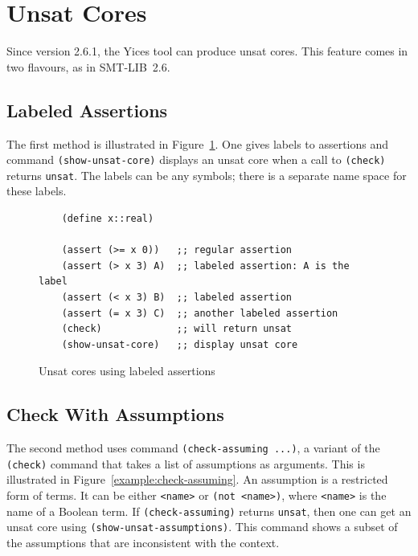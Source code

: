 \documentclass[11pt,twoside,fleqn,openright,titlepage]{cslreport}
\begin{document}
\section{Unsat Cores}

Since version 2.6.1, the Yices tool can produce unsat cores. This
feature comes in two flavours, as in SMT-LIB~2.6.

\subsection{Labeled Assertions}

The first method is illustrated in
Figure~\ref{example:labeled-assertions}. One gives labels to assertions and
command \texttt{(show-unsat-core)} displays an unsat core when a call
to \texttt{(check)} returns \texttt{unsat}.  The labels can be any
symbols; there is a separate name space for these labels.

\begin{figure}[h]
\begin{footnotesize}
\begin{verbatim}
    (define x::real)

    (assert (>= x 0))   ;; regular assertion
    (assert (> x 3) A)  ;; labeled assertion: A is the label
    (assert (< x 3) B)  ;; labeled assertion
    (assert (= x 3) C)  ;; another labeled assertion
    (check)             ;; will return unsat
    (show-unsat-core)   ;; display unsat core
\end{verbatim}
\end{footnotesize}
\caption{Unsat cores using labeled assertions}
\label{example:labeled-assertions}
\end{figure}


\subsection{Check With Assumptions}

The second method uses command \texttt{(check-assuming ...)}, a
variant of the \texttt{(check)} command that takes a list of
assumptions as arguments.  This is illustrated in
Figure~\ref{example:check-assuming}. An assumption is a restricted
form of terms. It can be either \texttt{<name>} or \texttt{(not
  <name>)}, where \texttt{<name>} is the name of a Boolean term.  If
\texttt{(check-assuming)} returns \texttt{unsat}, then one can get an
unsat core using \texttt{(show-unsat-assumptions)}. This command shows
a subset of the assumptions that are inconsistent with the context.
\end{document}
